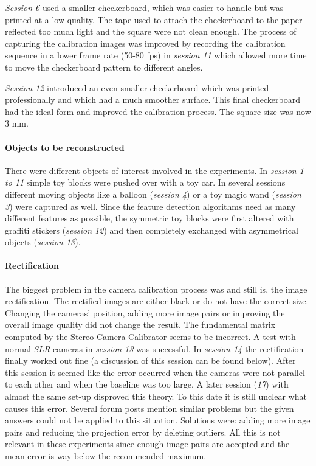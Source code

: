 \textit{Session 6} used a smaller checkerboard, which was easier to handle but was printed at a low quality. The tape used to attach the checkerboard to the paper reflected too much light and the square were not clean enough. The process of capturing the calibration images was improved by recording the calibration sequence in a lower frame rate (50-80 fps) in \textit{session 11} which allowed more time to move the checkerboard pattern to different angles.

\textit{Session 12} introduced an even smaller checkerboard which was printed professionally and which had a much smoother surface. This final checkerboard had the ideal form and improved the calibration process. The square size was now 3 mm.

\paragraph{Objects to be reconstructed}
There were different objects of interest involved in the experiments. In \textit{session 1 to 11} simple toy blocks were pushed over with a toy car. In several sessions different moving objects like a balloon (\textit{session 4}) or a toy magic wand (\textit{session 3}) were captured as well. Since the feature detection algorithms need as many different features as possible, the symmetric toy blocks were first altered with graffiti stickers (\textit{session 12}) and then completely exchanged with asymmetrical objects (\textit{session 13}).    

\paragraph{Rectification}
The biggest problem in the camera calibration process was and still is, the image rectification. The rectified images are either black or do not have the correct size. Changing the cameras' position, adding more image pairs or improving the overall image quality did not change the result. The fundamental matrix computed by the Stereo Camera Calibrator seems to be incorrect. A test with normal \textit{SLR} cameras in \textit{session 13} was successful. In \textit{session 14} the rectification finally worked out fine (a discussion of this session can be found below). After this session it seemed like the error occurred when the cameras were not parallel to each other and when the baseline was too large. A later session (\textit{17}) with almost the same set-up disproved this theory. To this date it is still unclear what causes this error. Several forum posts mention similar problems but the given answers could not be applied to this situation. Solutions were: adding more image pairs and reducing the projection error by deleting outliers. All this is not relevant in these experiments since enough image pairs are accepted and the mean error is way below the recommended maximum.

